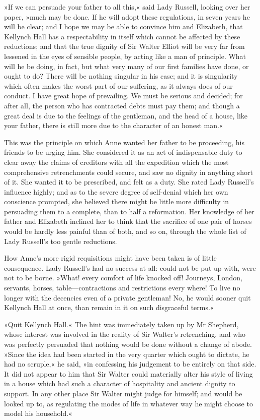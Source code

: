 »If we can persuade your father to all this,« said Lady Russell, looking over her paper, »much may be done. If he will adopt these regulations, in seven years he will be clear; and I hope we may be able to convince him and Elizabeth, that Kellynch Hall has a respectability in itself which cannot be affected by these reductions; and that the true dignity of Sir Walter Elliot will be very far from lessened in the eyes of sensible people, by acting like a man of principle. What will he be doing, in fact, but what very many of our first families have done, or ought to do? There will be nothing singular in his case; and it is singularity which often makes the worst part of our suffering, as it always does of our conduct. I have great hope of prevailing. We must be serious and decided; for after all, the person who has contracted debts must pay them; and though a great deal is due to the feelings of the gentleman, and the head of a house, like your father, there is still more due to the character of an honest man.«

This was the principle on which Anne wanted her father to be proceeding, his friends to be urging him. She considered it as an act of indispensable duty to clear away the claims of creditors with all the expedition which the most comprehensive retrenchments could secure, and saw no dignity in anything short of it. She wanted it to be prescribed, and felt as a duty. She rated Lady Russell's influence highly; and as to the severe degree of self-denial which her own conscience prompted, she believed there might be little more difficulty in persuading them to a complete, than to half a reformation. Her knowledge of her father and Elizabeth inclined her to think that the sacrifice of one pair of horses would be hardly less painful than of both, and so on, through the whole list of Lady Russell's too gentle reductions.

How Anne's more rigid requisitions might have been taken is of little consequence. Lady Russell's had no success at all: could not be put up with, were not to be borne. »What! every comfort of life knocked off! Journeys, London, servants, horses, table—contractions and restrictions every where! To live no longer with the decencies even of a private gentleman! No, he would sooner quit Kellynch Hall at once, than remain in it on such disgraceful terms.«

»Quit Kellynch Hall.« The hint was immediately taken up by Mr Shepherd, whose interest was involved in the reality of Sir Walter's retrenching, and who was perfectly persuaded that nothing would be done without a change of abode. »Since the idea had been started in the very quarter which ought to dictate, he had no scruple,« he said, »in confessing his judgement to be entirely on that side. It did not appear to him that Sir Walter could materially alter his style of living in a house which had such a character of hospitality and ancient dignity to support. In any other place Sir Walter might judge for himself; and would be looked up to, as regulating the modes of life in whatever way he might choose to model his household.«

